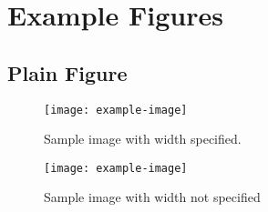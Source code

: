 %
%

\section{Example Figures}

\subsection{Plain Figure}

\begin{figure}[H]
  \centering
    \texttt{[image: example-image]}
  \caption{Sample image with width specified.}
  \label{fig:sample-figure}
\end{figure}

\begin{figure}[H]
  \centering
    \texttt{[image: example-image]}
  \caption{Sample image with width not specified}
  \label{fig:sample-figure-2}
\end{figure}

